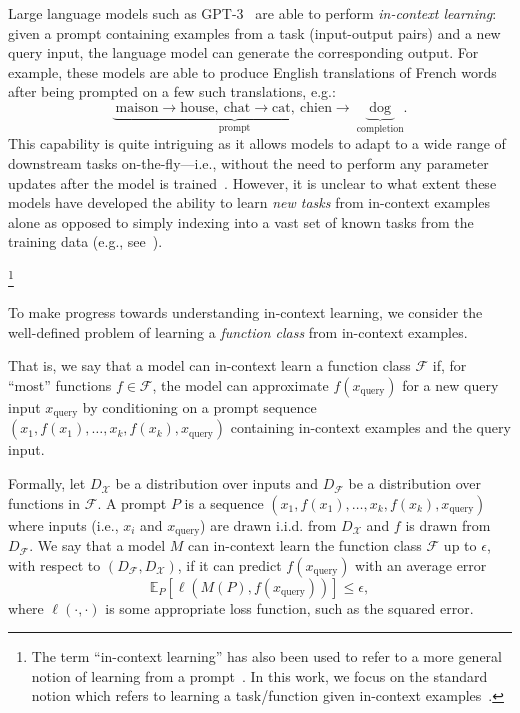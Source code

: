 \documentclass{article}
\begin{document}
Large language models such as GPT-3~\citep{brown2020language} are able to perform \emph{in-context learning}:
given a prompt containing examples from a task (input-output pairs) and a new query input, the language model can generate the corresponding output.
For example, these models are able to produce English translations of French words after being prompted on a few  such translations, e.g.:
\[\underbrace{\ \text{maison} \to \text{house},\ \text{chat} \to \text{cat},\ \text{chien} \to \ }_\text{prompt}
\underbrace{\ \text{dog}\ }_\text{completion}.\]
This capability is quite intriguing as it allows models to adapt to a wide range of downstream tasks on-the-fly---i.e., without the need to perform any parameter updates after the model is trained~\citep{brown2020language,lieber2021jurassic, rae2021scaling, black2022gpt}.
However, it is unclear to what extent these models have developed the ability to learn \emph{new tasks} from in-context examples alone as opposed to simply indexing into a vast set of known tasks from the training data (e.g., see~\citet{min2022rethinking}).

\footnote{The term ``in-context learning'' has also been used to refer to a more general notion of learning from a prompt~\citep{olsson2022context}. In this work, we focus on the standard notion which refers to learning a task/function given in-context examples~\citep{brown2020language}.}

To make progress towards understanding in-context learning, we consider the well-defined problem of learning a \emph{function class} from in-context examples.

That is, we say that a model can in-context learn a function class $\mathcal{F}$ if, for ``most'' functions $f \in \mathcal{F}$, the model can approximate $f(x_{\text{query}})$ for a new query input $x_{\text{query}}$ by conditioning on a prompt sequence $(x_1, f(x_1), \ldots,x_k, f(x_k), x_{\text{query}})$ containing in-context examples and the query input.

Formally, let $D_\mathcal{X}$ be a distribution over inputs and $D_{\mathcal{F}}$ be a distribution over functions in  $\mathcal{F}$. A prompt $P$ is a sequence $(x_1, f(x_1), \ldots, x_k, f(x_k), x_{\text{query}})$ where inputs (i.e., $x_i$ and $x_{\text{query}}$) are drawn i.i.d. from $D_\mathcal{X}$ and $f$ is drawn from $D_{\mathcal{F}}$. We say that a model $M$ can in-context learn the function class $\mathcal{F}$ up to $\epsilon$, with respect to  $(D_{\mathcal{F}}, D_\mathcal{X})$, if it can predict $f(x_\text{query})$ with an average error
\begin{equation}
\label{eq:in-context_loss}
\mathds{E}_{P}\left[\ell\left(M\left(P\right), f\left(x_{\text{query}}\right)\right) \right] \leq \epsilon,
\end{equation}
where $\ell(\cdot, \cdot)$ is some appropriate loss function, such as the squared error. 
\end{document}
